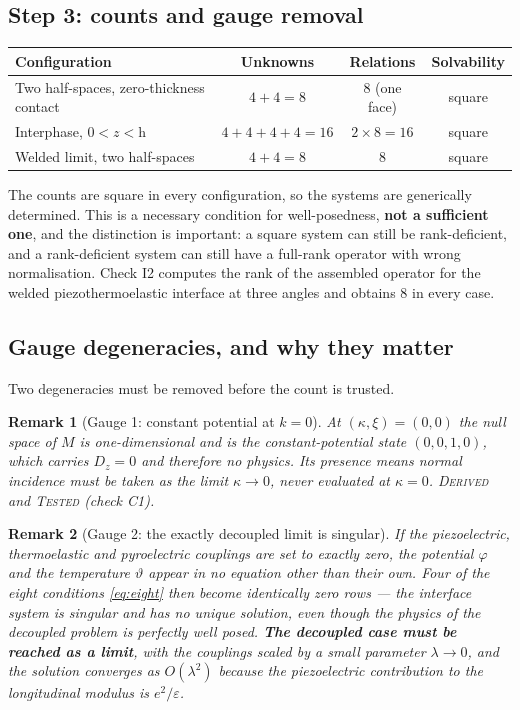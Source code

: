\documentclass[11pt]{article}
\newcommand{\bth}{\vartheta}
\theoremstyle{plain}
\newtheorem{remark}{Remark}
\begin{document}
\subsection{Step 3: counts and gauge removal}

\begin{center}
\begin{tabular}{lccc}
\toprule
Configuration & Unknowns & Relations & Solvability \\
\midrule
Two half-spaces, zero-thickness contact & $4+4=8$ & $8$ (one face) & square \\
Interphase, $0<z<\mathrm{h}$ & $4+4+4+4=16$ & $2\times8=16$ & square \\
Welded limit, two half-spaces & $4+4=8$ & $8$ & square \\
\bottomrule
\end{tabular}
\end{center}

The counts are square in every configuration, so the systems are generically
determined. This is a necessary condition for well-posedness, \textbf{not a
sufficient one}, and the distinction is important: a square system can still be
rank-deficient, and a rank-deficient system can still have a full-rank operator
with wrong normalisation. Check I2 computes the rank of the assembled operator
for the welded piezothermoelastic interface at three angles and obtains $8$ in
every case.

\subsection{Gauge degeneracies, and why they matter}

Two degeneracies must be removed before the count is trusted.

\begin{remark}[Gauge 1: constant potential at $k=0$]
At $(\kappa,\xi)=(0,0)$ the null space of $M$ is one-dimensional and is the
constant-potential state $(0,0,1,0)$, which carries $D_z=0$ and therefore no
physics. Its presence means normal incidence must be taken as the limit
$\kappa\to0$, never evaluated at $\kappa=0$. \textsc{Derived} and \textsc{Tested}
(check C1).
\end{remark}

\begin{remark}[Gauge 2: the exactly decoupled limit is singular]
\label{rem:decoupled-singular}
If the piezoelectric, thermoelastic and pyroelectric couplings are set to
\emph{exactly} zero, the potential $\varphi$ and the temperature $\bth$ appear in
no equation other than their own. Four of the eight conditions \eqref{eq:eight}
then become identically zero rows --- the interface system is singular and has no
unique solution, even though the physics of the decoupled problem is perfectly
well posed. \textbf{The decoupled case must be reached as a limit}, with the
couplings scaled by a small parameter $\lambda\to0$, and the solution converges
as $O(\lambda^2)$ because the piezoelectric contribution to the longitudinal
modulus is $e^2/\varepsilon$.
\end{remark}
\end{document}
